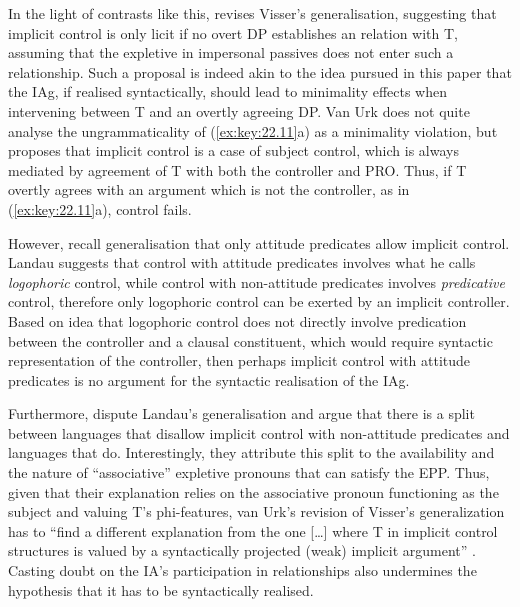 \documentclass[output=paper]{langsci/langscibook}
\begin{document}
In the light of contrasts like this, \textcite{vanUrk2013} revises Visser’s
generalisation, suggesting that implicit control is only licit if no overt DP
establishes an  relation with T, assuming that the expletive in impersonal
passives does not enter such a relationship. Such a proposal is indeed akin to
the idea pursued in this paper that the \gls{IAg}, if realised syntactically, should
lead to minimality effects when intervening between T and an overtly agreeing
DP. Van Urk does not quite analyse the ungrammaticality of
(\ref{ex:key:22.11}a) as a minimality violation, but proposes that implicit
control is a case of subject control, which is always mediated by agreement of
T with both the controller and PRO. Thus, if T overtly agrees with an argument
which is not the controller, as in (\ref{ex:key:22.11}a), control fails.

However, recall  generalisation that only attitude
predicates allow implicit control. Landau suggests that control with attitude
predicates involves what he calls \emph{logophoric} control, while control with
non-attitude predicates involves \emph{predicative} control, therefore only
logophoric control can be exerted by an implicit controller. Based on
 idea that logophoric control does not directly involve
predication between the controller and a clausal constituent, which would
require syntactic representation of the controller, then perhaps implicit
control with attitude predicates is no argument for the syntactic realisation
of the \gls{IAg}.

Furthermore, \citet{PitteroffSchafer2017} dispute Landau’s generalisation and
argue that there is a split between languages that disallow implicit control
with non-attitude predicates and languages that do. Interestingly, they
attribute this split to the availability and the nature of
\enquote{associative} expletive pronouns that can satisfy the
\gls{EPP}. Thus, given that their explanation relies on the
associative pronoun functioning as the subject and valuing T’s phi-features,
van Urk’s revision of Visser’s generalization has to “find a different
explanation from the one [\dots{}] where T in implicit control structures is
valued by a syntactically projected (weak) implicit argument”
\parencite[38--39]{PitteroffSchafer2017}. Casting doubt on the IA’s
participation in  relationships also undermines the hypothesis that it has
to be syntactically realised.
\end{document}
